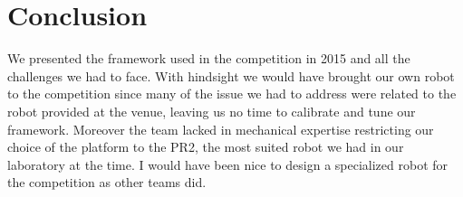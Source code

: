 \documentclass[letterpaper, 10pt, conference]{ieeeconf}
\begin{document}












\section{Conclusion}
\label{sec:conclusion}

We presented the framework used in the competition in 2015 and all the challenges we had to face. With hindsight we would have brought our own robot to the competition since many of the issue we had to address were related to the robot provided at the venue, leaving us no time to calibrate and tune our framework. Moreover the team lacked in mechanical expertise restricting our choice of the platform to the PR2, the most suited robot we had in our laboratory at the time. I would have been nice to design a specialized robot for the competition as other teams did. 
\end{document}
